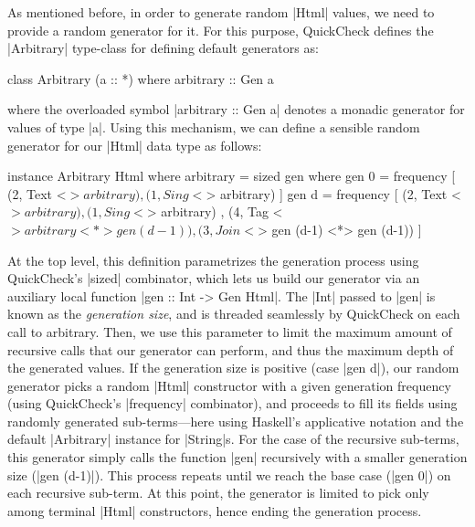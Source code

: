 %
As mentioned before, in order to generate random |Html| values, we need to
provide a random generator for it.
%
For this purpose, QuickCheck defines the |Arbitrary| type-class for defining
default generators as:

\begin{code}
class Arbitrary (a :: *) where
  arbitrary :: Gen a
\end{code}
%
where the overloaded symbol |arbitrary :: Gen a| denotes a monadic generator for
values of type |a|.
%
Using this mechanism, we can define a sensible random generator for our |Html|
data type as follows:

\begin{code}
instance Arbitrary Html where
  arbitrary = sized gen
    where  gen 0 = frequency
             [  (2,  Text    <$> arbitrary)
             ,  (1,  Sing    <$> arbitrary) ]
           gen d = frequency
             [  (2,  Text    <$> arbitrary)
             ,  (1,  Sing    <$> arbitrary)
             ,  (4,  Tag     <$> arbitrary  <*> gen (d-1))
             ,  (3,  Join    <$> gen (d-1)  <*> gen (d-1)) ]
\end{code} %
%
At the top level, this definition parametrizes the generation process using
QuickCheck's |sized| combinator, which lets us build our generator via an
auxiliary local function |gen :: Int -> Gen Html|.
%
The |Int| passed to |gen| is known as the \emph{generation size}, and is
threaded seamlessly by QuickCheck on each call to arbitrary.
%
Then, we use this parameter to limit the maximum amount of recursive calls that
our generator can perform, and thus the maximum depth of the generated values.
%
If the generation size is positive (case |gen d|), our random generator picks a
random |Html| constructor with a given generation frequency (using QuickCheck's
|frequency| combinator), and proceeds to fill its fields using randomly
generated sub-terms---here using Haskell's applicative notation
\cite{Mcbride2008} and the default |Arbitrary| instance for |String|s.
%
For the case of the recursive sub-terms, this generator simply calls the
function |gen| recursively with a smaller generation size (|gen (d-1)|).
%
This process repeats until we reach the base case (|gen 0|) on each recursive
sub-term.
%
At this point, the generator is limited to pick only among terminal |Html|
constructors, hence ending the generation process.


